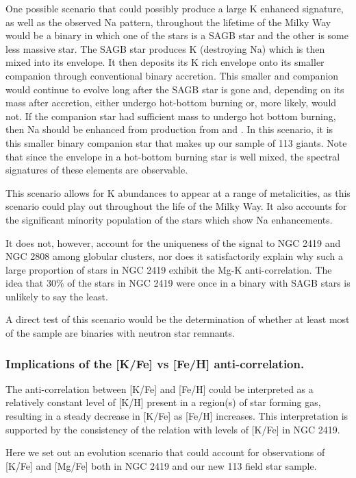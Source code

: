 \documentclass[a4paper,fleqn,usenatbib]{mnras}
\begin{document}
One possible scenario that could possibly produce a large K enhanced signature, as well as the observed Na pattern, throughout the lifetime of the Milky Way would be a binary in which one of the stars is a SAGB star and the other is some less massive star. The SAGB star produces K (destroying Na) which is then mixed into its envelope. It then deposits its K rich envelope onto its smaller companion through conventional binary accretion. This smaller and companion would continue to evolve long after the SAGB star is gone and, depending on its mass after accretion, either undergo hot-bottom burning or, more likely, would not. If the companion star had sufficient mass to undergo hot bottom burning, then Na should be enhanced from production from  and . In this scenario, it is this smaller binary companion star that makes up our sample of 113 giants. Note that since the envelope in a hot-bottom burning star is well mixed, the spectral signatures of these elements are observable.

This scenario allows for K abundances to appear at a range of metalicities, as this scenario could play out throughout the life of the Milky Way. It also  accounts for the significant minority population of the stars which show Na enhancements.

It does not, however, account for the uniqueness of the signal to NGC 2419 and NGC 2808 among globular clusters, nor does it satisfactorily explain why such a large proportion of stars in NGC 2419 exhibit the Mg-K anti-correlation. The idea that 30\% of the stars in NGC 2419 were once in a binary with SAGB stars is unlikely to say the least. 

A direct test of this scenario would be the determination of whether at least most of the sample are binaries with neutron star remnants.

\subsubsection{Implications of the [K/Fe] vs [Fe/H] anti-correlation.}

The anti-correlation between [K/Fe] and [Fe/H] could be interpreted as a relatively constant level of [K/H] present in a region(s) of star forming gas, resulting in a steady decrease in [K/Fe] as [Fe/H] increases. This interpretation is supported by the consistency of the relation with levels of [K/Fe] in NGC 2419.

Here we set out an evolution scenario that could account for observations of [K/Fe] and [Mg/Fe] both in NGC 2419 and our new 113 field star sample.
\end{document}
